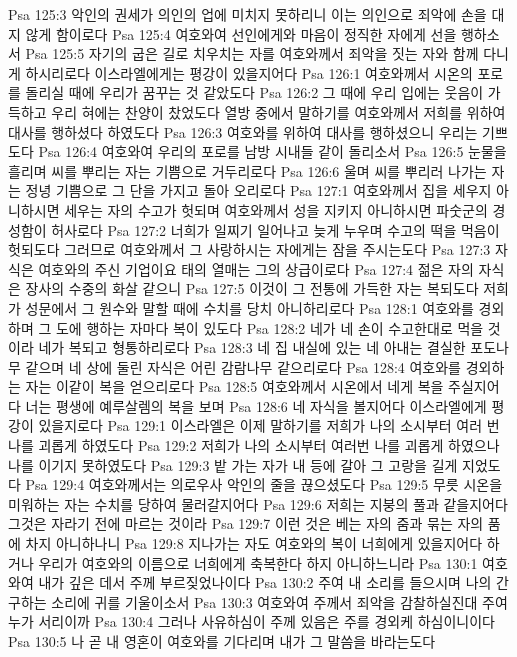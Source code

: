 Psa 125:3  악인의 권세가 의인의 업에 미치지 못하리니 이는 의인으로 죄악에 손을 대지 않게 함이로다
Psa 125:4  여호와여 선인에게와 마음이 정직한 자에게 선을 행하소서
Psa 125:5  자기의 굽은 길로 치우치는 자를 여호와께서 죄악을 짓는 자와 함께 다니게 하시리로다 이스라엘에게는 평강이 있을지어다
Psa 126:1  여호와께서 시온의 포로를 돌리실 때에 우리가 꿈꾸는 것 같았도다
Psa 126:2  그 때에 우리 입에는 웃음이 가득하고 우리 혀에는 찬양이 찼었도다 열방 중에서 말하기를 여호와께서 저희를 위하여 대사를 행하셨다 하였도다
Psa 126:3  여호와를 위하여 대사를 행하셨으니 우리는 기쁘도다
Psa 126:4  여호와여 우리의 포로를 남방 시내들 같이 돌리소서
Psa 126:5  눈물을 흘리며 씨를 뿌리는 자는 기쁨으로 거두리로다
Psa 126:6  울며 씨를 뿌리러 나가는 자는 정녕 기쁨으로 그 단을 가지고 돌아 오리로다
Psa 127:1  여호와께서 집을 세우지 아니하시면 세우는 자의 수고가 헛되며 여호와께서 성을 지키지 아니하시면 파숫군의 경성함이 허사로다
Psa 127:2  너희가 일찌기 일어나고 늦게 누우며 수고의 떡을 먹음이 헛되도다 그러므로 여호와께서 그 사랑하시는 자에게는 잠을 주시는도다
Psa 127:3  자식은 여호와의 주신 기업이요 태의 열매는 그의 상급이로다
Psa 127:4  젊은 자의 자식은 장사의 수중의 화살 같으니
Psa 127:5  이것이 그 전통에 가득한 자는 복되도다 저희가 성문에서 그 원수와 말할 때에 수치를 당치 아니하리로다
Psa 128:1  여호와를 경외하며 그 도에 행하는 자마다 복이 있도다
Psa 128:2  네가 네 손이 수고한대로 먹을 것이라 네가 복되고 형통하리로다
Psa 128:3  네 집 내실에 있는 네 아내는 결실한 포도나무 같으며 네 상에 둘린 자식은 어린 감람나무 같으리로다
Psa 128:4  여호와를 경외하는 자는 이같이 복을 얻으리로다
Psa 128:5  여호와께서 시온에서 네게 복을 주실지어다 너는 평생에 예루살렘의 복을 보며
Psa 128:6  네 자식을 볼지어다 이스라엘에게 평강이 있을지로다
Psa 129:1  이스라엘은 이제 말하기를 저희가 나의 소시부터 여러 번 나를 괴롭게 하였도다
Psa 129:2  저희가 나의 소시부터 여러번 나를 괴롭게 하였으나 나를 이기지 못하였도다
Psa 129:3  밭 가는 자가 내 등에 갈아 그 고랑을 길게 지었도다
Psa 129:4  여호와께서는 의로우사 악인의 줄을 끊으셨도다
Psa 129:5  무릇 시온을 미워하는 자는 수치를 당하여 물러갈지어다
Psa 129:6  저희는 지붕의 풀과 같을지어다 그것은 자라기 전에 마르는 것이라
Psa 129:7  이런 것은 베는 자의 줌과 묶는 자의 품에 차지 아니하나니
Psa 129:8  지나가는 자도 여호와의 복이 너희에게 있을지어다 하거나 우리가 여호와의 이름으로 너희에게 축복한다 하지 아니하느니라
Psa 130:1  여호와여 내가 깊은 데서 주께 부르짖었나이다
Psa 130:2  주여 내 소리를 들으시며 나의 간구하는 소리에 귀를 기울이소서
Psa 130:3  여호와여 주께서 죄악을 감찰하실진대 주여 누가 서리이까
Psa 130:4  그러나 사유하심이 주께 있음은 주를 경외케 하심이니이다
Psa 130:5  나 곧 내 영혼이 여호와를 기다리며 내가 그 말씀을 바라는도다

